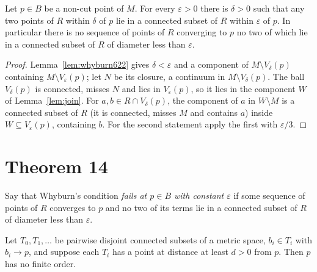 
\begin{proposition}\label{prop:local-join}
Let $p\in B$ be a non-cut point of $M$. For every $\varepsilon>0$ there is $\delta>0$ such that any two points of $R$ within $\delta$ of $p$ lie in a connected subset of $R$ within
$\varepsilon$ of $p$. In particular there is no sequence of points of $R$ converging to $p$ no two of which lie in a connected subset of $R$ of diameter less than $\varepsilon$.
\end{proposition}

\begin{proof}
Lemma~\ref{lem:whyburn622} gives $\delta<\varepsilon$ and a component of $M\setminus V_\delta(p)$ containing $M\setminus V_\varepsilon(p)$; let $N$ be its closure, a continuum in $M\setminus V_\delta(p)$. The ball
$V_\delta(p)$ is connected, misses $N$ and lies in $V_\varepsilon(p)$, so it lies in the component $W$ of Lemma~\ref{lem:join}. For $a,b\in R\cap V_\delta(p)$, the component of $a$ in $W\setminus M$ is a
connected subset of $R$ (it is connected, misses $M$ and contains $a$) inside $W\subseteq V_\varepsilon(p)$, containing $b$. For the second statement apply the first with $\varepsilon/3$.
\end{proof}


\section{Theorem 14}

Say that Whyburn's condition \emph{fails at $p\in B$ with constant $\varepsilon$} if some sequence of points of $R$ converges to $p$ and no two of its terms lie in a connected subset of
$R$ of diameter less than $\varepsilon$.


\begin{lemma}\label{lem:accum}
Let $T_0,T_1,\dots$ be pairwise disjoint connected subsets of a metric space, $b_i\in T_i$ with $b_i\to p$, and suppose each $T_i$ has a point at distance at least $d>0$ from $p$. Then $p$
has no finite order.
\end{lemma}

